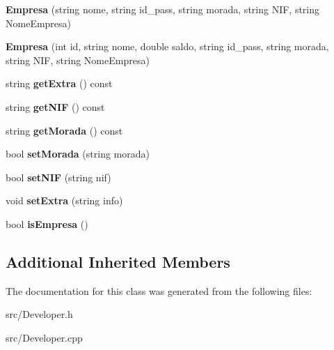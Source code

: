 \begin{DoxyCompactItemize}
\item 
\hypertarget{class_empresa_ab5251256f7e8fdaca8857bde0323a75c}{{\bfseries Empresa} (string nome, string id\+\_\+pass, string morada, string N\+I\+F, string Nome\+Empresa)}\label{class_empresa_ab5251256f7e8fdaca8857bde0323a75c}

\item 
\hypertarget{class_empresa_ae2bbc40fff2c297a56dc73deb9202ae3}{{\bfseries Empresa} (int id, string nome, double saldo, string id\+\_\+pass, string morada, string N\+I\+F, string Nome\+Empresa)}\label{class_empresa_ae2bbc40fff2c297a56dc73deb9202ae3}

\item 
\hypertarget{class_empresa_ac0c678ba135778e8c62ba4944a68e925}{string {\bfseries get\+Extra} () const }\label{class_empresa_ac0c678ba135778e8c62ba4944a68e925}

\item 
\hypertarget{class_empresa_a637ca93cd186c92c08d052182883dad6}{string {\bfseries get\+N\+I\+F} () const }\label{class_empresa_a637ca93cd186c92c08d052182883dad6}

\item 
\hypertarget{class_empresa_acfda583f23a4374fe6a9602cb9322992}{string {\bfseries get\+Morada} () const }\label{class_empresa_acfda583f23a4374fe6a9602cb9322992}

\item 
\hypertarget{class_empresa_aab6d20d5d48259da372efb149edf4f0c}{bool {\bfseries set\+Morada} (string morada)}\label{class_empresa_aab6d20d5d48259da372efb149edf4f0c}

\item 
\hypertarget{class_empresa_ac4dc3fdd2a56f820063e7b67282e6e5f}{bool {\bfseries set\+N\+I\+F} (string nif)}\label{class_empresa_ac4dc3fdd2a56f820063e7b67282e6e5f}

\item 
\hypertarget{class_empresa_ad6923e466ff3289e0bfb2e777ef41ee9}{void {\bfseries set\+Extra} (string info)}\label{class_empresa_ad6923e466ff3289e0bfb2e777ef41ee9}

\item 
\hypertarget{class_empresa_ae8f46765b750fac2520ad6d4068b9beb}{bool {\bfseries is\+Empresa} ()}\label{class_empresa_ae8f46765b750fac2520ad6d4068b9beb}

\end{DoxyCompactItemize}
\subsection*{Additional Inherited Members}


The documentation for this class was generated from the following files\+:\begin{DoxyCompactItemize}
\item 
src/Developer.\+h\item 
src/Developer.\+cpp\end{DoxyCompactItemize}
